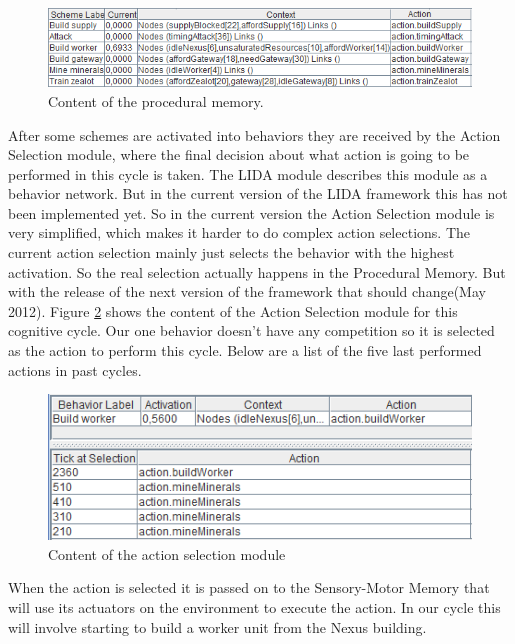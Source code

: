 \begin{figure}[h!tb]
\centering
\includegraphics[width=\textwidth]{graphics/procedural_memory.png}
\caption{Content of the procedural memory.}
\label{fig:proceduralmemory}
\end{figure}

After some schemes are activated into behaviors they are received by the Action Selection module, where the final decision about what action is going to be performed in this cycle is taken. The LIDA module describes this module as a behavior network\cite{maes1989right}. But in the current version of the LIDA framework this has not been implemented yet. So in the current version the Action Selection module is very simplified, which makes it harder to do complex action selections. The current action selection mainly just selects the behavior with the highest activation. So the real selection actually happens in the Procedural Memory. But with the release of the next version of the framework that should change(May 2012). Figure \ref{fig:actionselection} shows the content of the Action Selection module for this cognitive cycle. Our one behavior doesn't have any competition so it is selected as the action to perform this cycle. Below are a list of the five last performed actions in past cycles.

\begin{figure}[h!tb]
\centering
\includegraphics[scale=1.0]{graphics/action_selection.png}
\caption{Content of the action selection module}
\label{fig:actionselection}
\end{figure}

When the action is selected it is passed on to the Sensory-Motor Memory that will use its actuators on the environment to execute the action. In our cycle this will involve starting to build a worker unit from the Nexus building.
